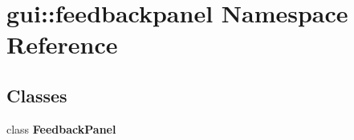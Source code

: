 \section{gui::feedbackpanel Namespace Reference}
\label{namespacegui_1_1feedbackpanel}


\subsection*{Classes}
\begin{CompactItemize}
\item 
class {\bf FeedbackPanel}
\end{CompactItemize}
